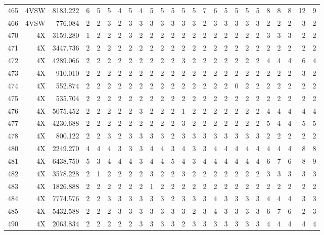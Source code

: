 \documentclass[12pt]{article}\usepackage[]{graphicx}\usepackage[]{color}
\begin{document}
\begin{landscapepage}
\begin{longtable}[t]{crrrrrrrrrrrrrrrcrrrrrrrr}
465 & 4VSW & 8183.222 & 6 & 5 & 5 & 4 & 5 & 4 & 5 & 5 & 5 & 5 & 5 & 7 & 6 & 5 & 5 & 5 & 5 & 8 & 8 & 8 & 12 & 9\\
466 & 4VSW & 776.084 & 2 & 2 & 3 & 2 & 3 & 3 & 3 & 3 & 3 & 3 & 3 & 2 & 3 & 3 & 3 & 3 & 3 & 2 & 2 & 2 & 3 & 2\\
470 & 4X & 3159.280 & 1 & 2 & 2 & 2 & 3 & 2 & 2 & 2 & 2 & 2 & 2 & 2 & 2 & 2 & 2 & 2 & 2 & 3 & 3 & 3 & 2 & 2\\
471 & 4X & 3447.736 & 2 & 2 & 2 & 2 & 2 & 2 & 2 & 2 & 2 & 2 & 2 & 2 & 2 & 2 & 2 & 2 & 2 & 2 & 2 & 2 & 2 & 2\\
472 & 4X & 4289.066 & 2 & 2 & 2 & 2 & 2 & 2 & 2 & 2 & 2 & 3 & 2 & 2 & 2 & 2 & 2 & 2 & 2 & 4 & 4 & 4 & 6 & 4\\
473 & 4X & 910.010 & 2 & 2 & 2 & 2 & 2 & 2 & 2 & 2 & 2 & 2 & 2 & 2 & 2 & 2 & 2 & 2 & 2 & 2 & 2 & 2 & 3 & 2\\
474 & 4X & 552.874 & 2 & 2 & 2 & 2 & 2 & 2 & 2 & 2 & 2 & 2 & 2 & 2 & 2 & 2 & 0 & 2 & 2 & 2 & 2 & 2 & 2 & 2\\
475 & 4X & 535.704 & 2 & 2 & 2 & 2 & 2 & 2 & 2 & 2 & 2 & 2 & 2 & 2 & 2 & 2 & 2 & 2 & 2 & 2 & 2 & 2 & 2 & 2\\
476 & 4X & 5075.452 & 2 & 2 & 2 & 2 & 2 & 3 & 2 & 2 & 2 & 1 & 2 & 2 & 2 & 2 & 2 & 2 & 2 & 4 & 4 & 4 & 4 & 4\\
477 & 4X & 4230.688 & 2 & 2 & 2 & 2 & 2 & 2 & 2 & 2 & 2 & 3 & 2 & 2 & 2 & 2 & 2 & 2 & 2 & 5 & 4 & 4 & 5 & 5\\
478 & 4X & 800.122 & 2 & 2 & 3 & 2 & 3 & 3 & 3 & 3 & 2 & 3 & 3 & 3 & 3 & 3 & 3 & 3 & 3 & 2 & 2 & 2 & 2 & 2\\
480 & 4X & 2249.270 & 4 & 4 & 4 & 3 & 3 & 3 & 4 & 4 & 3 & 4 & 3 & 3 & 4 & 4 & 4 & 4 & 4 & 4 & 4 & 4 & 8 & 8\\
481 & 4X & 6438.750 & 5 & 3 & 4 & 4 & 4 & 3 & 4 & 4 & 5 & 4 & 3 & 4 & 4 & 4 & 4 & 4 & 4 & 6 & 7 & 6 & 8 & 9\\
482 & 4X & 3578.228 & 2 & 1 & 2 & 2 & 2 & 2 & 3 & 2 & 2 & 3 & 2 & 2 & 2 & 2 & 2 & 2 & 2 & 3 & 3 & 3 & 3 & 3\\
483 & 4X & 1826.888 & 2 & 2 & 2 & 2 & 2 & 2 & 1 & 2 & 2 & 2 & 2 & 2 & 2 & 2 & 2 & 2 & 2 & 2 & 2 & 2 & 2 & 2\\
484 & 4X & 7774.576 & 2 & 2 & 3 & 3 & 3 & 3 & 3 & 3 & 2 & 3 & 3 & 3 & 4 & 3 & 3 & 3 & 3 & 4 & 4 & 4 & 3 & 3\\
485 & 4X & 5432.588 & 2 & 2 & 2 & 3 & 3 & 3 & 3 & 3 & 3 & 3 & 2 & 3 & 4 & 3 & 3 & 3 & 3 & 6 & 7 & 6 & 2 & 3\\
490 & 4X & 2063.834 & 2 & 2 & 2 & 2 & 2 & 3 & 3 & 3 & 3 & 2 & 3 & 3 & 3 & 3 & 3 & 3 & 3 & 4 & 4 & 4 & 4 & 4\\

\end{longtable}
\end{landscapepage}
\end{document}
